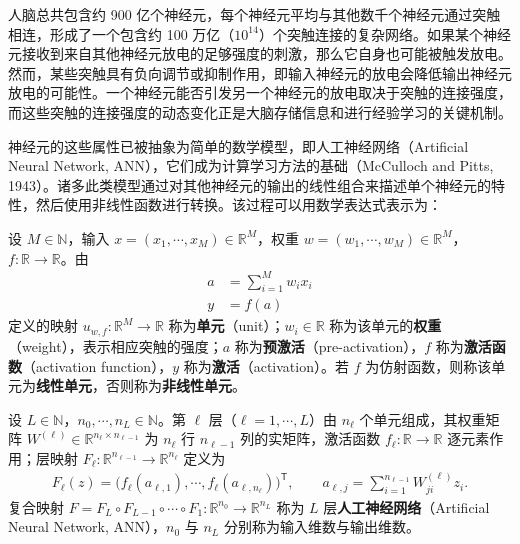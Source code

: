 \documentclass[../../main.tex]{subfiles}
\begin{document}
人脑总共包含约 900 亿个神经元，每个神经元平均与其他数千个神经元通过突触相连，形成了一个包含约 100 万亿（$10^{14}$）个突触连接的复杂网络。如果某个神经元接收到来自其他神经元放电的足够强度的刺激，那么它自身也可能被触发放电。然而，某些突触具有负向调节或抑制作用，即输入神经元的放电会降低输出神经元放电的可能性。一个神经元能否引发另一个神经元的放电取决于突触的连接强度，而这些突触的连接强度的动态变化正是大脑存储信息和进行经验学习的关键机制。

神经元的这些属性已被抽象为简单的数学模型，即人工神经网络（Artificial Neural Network, ANN），它们成为计算学习方法的基础（McCulloch and Pitts, 1943）。诸多此类模型通过对其他神经元的输出的线性组合来描述单个神经元的特性，然后使用非线性函数进行转换。该过程可以用数学表达式表示为：

\begin{definition}[人工神经网络]\label{definition:ch01-人工神经网络}
设 $M\in\mathbb{N}$，输入 $x=(x_1,\cdots,x_M)\in\mathbb{R}^{M}$，权重 $w=(w_1,\cdots,w_M)\in\mathbb{R}^{M}$，$f:\mathbb{R}\to\mathbb{R}$。由
\begin{align}
  a &= \sum_{i=1}^{M} w_i x_i \label{align:ch01-神经元预激活}\\
  y &= f(a) \label{align:ch01-神经元激活}
\end{align}
定义的映射 $u_{w,f}:\mathbb{R}^{M}\to\mathbb{R}$ 称为\textbf{单元}（unit）；$w_i\in\mathbb{R}$ 称为该单元的\textbf{权重}（weight），表示相应突触的强度；$a$ 称为\textbf{预激活}（pre-activation），$f$ 称为\textbf{激活函数}（activation function），$y$ 称为\textbf{激活}（activation）。若 $f$ 为仿射函数，则称该单元为\textbf{线性单元}，否则称为\textbf{非线性单元}。

设 $L\in\mathbb{N}$，$n_{0},\cdots,n_{L}\in\mathbb{N}$。第 $\ell$ 层（$\ell=1,\cdots,L$）由 $n_{\ell}$ 个单元组成，其权重矩阵 $W^{(\ell)}\in\mathbb{R}^{n_{\ell}\times n_{\ell-1}}$ 为 $n_{\ell}$ 行 $n_{\ell-1}$ 列的实矩阵，激活函数 $f_{\ell}:\mathbb{R}\to\mathbb{R}$ 逐元素作用；层映射 $F_{\ell}:\mathbb{R}^{n_{\ell-1}}\to\mathbb{R}^{n_{\ell}}$ 定义为
\begin{align*}
  F_{\ell}(z)=\bigl(f_{\ell}(a_{\ell,1}),\cdots,f_{\ell}(a_{\ell,n_{\ell}})\bigr)^{\mathsf{T}},
  \qquad
  a_{\ell,j}=\sum_{i=1}^{n_{\ell-1}}W^{(\ell)}_{ji}z_i .
\end{align*}
复合映射 $F=F_{L}\circ F_{L-1}\circ\cdots\circ F_{1}:\mathbb{R}^{n_{0}}\to\mathbb{R}^{n_{L}}$ 称为 $L$ 层\textbf{人工神经网络}（Artificial Neural Network, ANN），$n_{0}$ 与 $n_{L}$ 分别称为输入维数与输出维数。
\end{definition}
\end{document}

